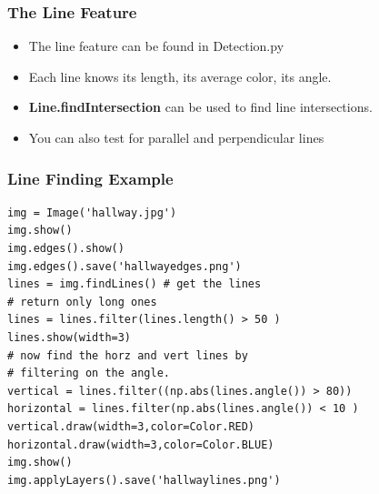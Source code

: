 \documentclass{beamer}
\begin{document}
\begin{frame}
  \frametitle{The Line Feature}
\begin{itemize}
\item The line feature can be found in Detection.py
\item Each line knows its length, its average color, its angle.
\item \textbf{Line.findIntersection} can be used to find line intersections.
\item You can also test for parallel and perpendicular lines
\end{itemize}
\end{frame}
\begin{frame}[fragile] 
\frametitle{Line Finding Example}
\begin{example}
\begin{verbatim}
img = Image('hallway.jpg')
img.show()
img.edges().show()
img.edges().save('hallwayedges.png')
lines = img.findLines() # get the lines
# return only long ones
lines = lines.filter(lines.length() > 50 )
lines.show(width=3)
# now find the horz and vert lines by 
# filtering on the angle.
vertical = lines.filter((np.abs(lines.angle()) > 80))
horizontal = lines.filter(np.abs(lines.angle()) < 10 )
vertical.draw(width=3,color=Color.RED)
horizontal.draw(width=3,color=Color.BLUE)
img.show()
img.applyLayers().save('hallwaylines.png')
\end{verbatim}
\end{example}
\end{frame} 
\end{document}
